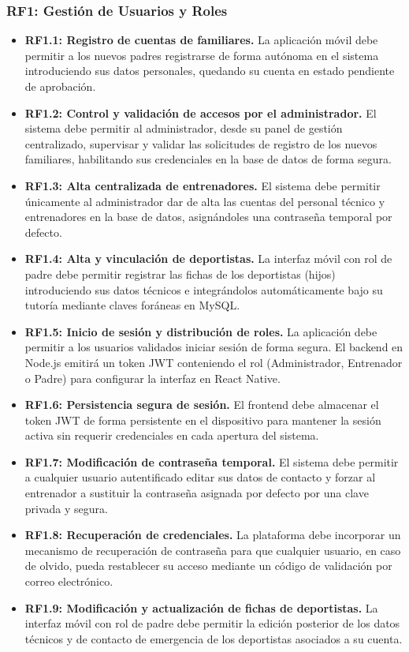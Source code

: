         \subsubsection*{RF1: Gestión de Usuarios y Roles}
        \begin{itemize}
            \item \textbf{RF1.1: Registro de cuentas de familiares.} La aplicación móvil debe permitir a los nuevos padres registrarse de forma autónoma en el sistema introduciendo sus datos personales, quedando su cuenta en estado pendiente de aprobación.
            \item \textbf{RF1.2: Control y validación de accesos por el administrador.} El sistema debe permitir al administrador, desde su panel de gestión centralizado, supervisar y validar las solicitudes de registro de los nuevos familiares, habilitando sus credenciales en la base de datos de forma segura.
            \item \textbf{RF1.3: Alta centralizada de entrenadores.} El sistema debe permitir únicamente al administrador dar de alta las cuentas del personal técnico y entrenadores en la base de datos, asignándoles una contraseña temporal por defecto.
            \item \textbf{RF1.4: Alta y vinculación de deportistas.} La interfaz móvil con rol de padre debe permitir registrar las fichas de los deportistas (hijos) introduciendo sus datos técnicos e integrándolos automáticamente bajo su tutoría mediante claves foráneas en MySQL.
            \item \textbf{RF1.5: Inicio de sesión y distribución de roles.} La aplicación debe permitir a los usuarios validados iniciar sesión de forma segura. El backend en Node.js emitirá un token JWT conteniendo el rol (Administrador, Entrenador o Padre) para configurar la interfaz en React Native.
            \item \textbf{RF1.6: Persistencia segura de sesión.} El frontend debe almacenar el token JWT de forma persistente en el dispositivo para mantener la sesión activa sin requerir credenciales en cada apertura del sistema.
            \item \textbf{RF1.7: Modificación de contraseña temporal.} El sistema debe permitir a cualquier usuario autentificado editar sus datos de contacto y forzar al entrenador a sustituir la contraseña asignada por defecto por una clave privada y segura.
            \item \textbf{RF1.8: Recuperación de credenciales.} La plataforma debe incorporar un mecanismo de recuperación de contraseña para que cualquier usuario, en caso de olvido, pueda restablecer su acceso mediante un código de validación por correo electrónico.
            \item \textbf{RF1.9: Modificación y actualización de fichas de deportistas.} La interfaz móvil con rol de padre debe permitir la edición posterior de los datos técnicos y de contacto de emergencia de los deportistas asociados a su cuenta.
        \end{itemize}

